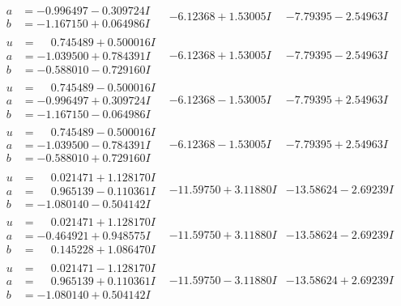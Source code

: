 \documentclass[1p]{elsarticle_modified}
\theoremstyle{definition}
\begin{document}
$$\begin{array}{c|c|c}
\begin{aligned}
a &= -0.996497 - 0.309724 I \\
b &= -1.167150 + 0.064986 I\end{aligned}
 & -6.12368 + 1.53005 I & -7.79395 - 2.54963 I \\ \hline\begin{aligned}
u &= \phantom{-}0.745489 + 0.500016 I \\
a &= -1.039500 + 0.784391 I \\
b &= -0.588010 - 0.729160 I\end{aligned}
 & -6.12368 + 1.53005 I & -7.79395 - 2.54963 I \\ \hline\begin{aligned}
u &= \phantom{-}0.745489 - 0.500016 I \\
a &= -0.996497 + 0.309724 I \\
b &= -1.167150 - 0.064986 I\end{aligned}
 & -6.12368 - 1.53005 I & -7.79395 + 2.54963 I \\ \hline\begin{aligned}
u &= \phantom{-}0.745489 - 0.500016 I \\
a &= -1.039500 - 0.784391 I \\
b &= -0.588010 + 0.729160 I\end{aligned}
 & -6.12368 - 1.53005 I & -7.79395 + 2.54963 I \\ \hline\begin{aligned}
u &= \phantom{-}0.021471 + 1.128170 I \\
a &= \phantom{-}0.965139 - 0.110361 I \\
b &= -1.080140 - 0.504142 I\end{aligned}
 & -11.59750 + 3.11880 I & -13.58624 - 2.69239 I \\ \hline\begin{aligned}
u &= \phantom{-}0.021471 + 1.128170 I \\
a &= -0.464921 + 0.948575 I \\
b &= \phantom{-}0.145228 + 1.086470 I\end{aligned}
 & -11.59750 + 3.11880 I & -13.58624 - 2.69239 I \\ \hline\begin{aligned}
u &= \phantom{-}0.021471 - 1.128170 I \\
a &= \phantom{-}0.965139 + 0.110361 I \\
b &= -1.080140 + 0.504142 I\end{aligned}
 & -11.59750 - 3.11880 I & -13.58624 + 2.69239 I \\ \hline\begin{aligned}

\end{aligned}
\end{array}$$
\end{document}
